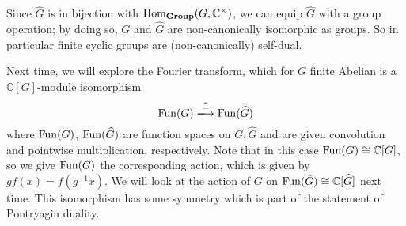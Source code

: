 \documentclass[../../rtnotes.tex]{subfiles}
\begin{document}
\begin{figure}[h]
  \centering
\end{figure}

Since $\widehat G$ is in bijection with $\operatorname{Hom}_{{\normalfont\mathbf{Group}}}(G,\mathbb C^\times)$, we can equip $\widehat G$ with a group operation; by doing so, $G$ and $\widehat G$ are non-canonically isomorphic as groups. So in particular finite cyclic groups are (non-canonically) self-dual.

Next time, we will explore the Fourier transform, which for $G$ finite Abelian is a $\mathbb C[G]$-module isomorphism
\[\Fun(G)\xlongrightarrow{\widehat{-}}\Fun(\widehat G)\]
where $\operatorname{Fun}(G)$, $\operatorname{Fun}(\widehat G)$ are function spaces on $G,\widehat G$ and are given convolution and pointwise multiplication, respectively. Note that in this case $\operatorname{Fun}(G) \cong \mathbb C[G]$, so we give $\operatorname{Fun}(G)$ the corresponding action, which is given by $gf(x) = f(g^{-1}x)$. We will look at the action of $G$ on $\operatorname{Fun}(\hat G)\cong \mathbb C[\widehat G]$ next time. This isomorphism has some symmetry which is part of the statement of Pontryagin duality.
\end{document}
